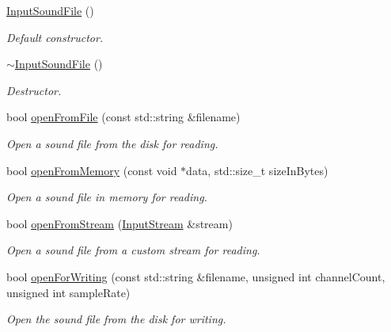 \begin{DoxyCompactItemize}
\item 
\mbox{\label{classsf_1_1_input_sound_file_a3b95347de25d1d93a3230287cf47a077}} 
\hyperlink{classsf_1_1_input_sound_file_a3b95347de25d1d93a3230287cf47a077}{Input\+Sound\+File} ()
\begin{DoxyCompactList}\small\item\em Default constructor. \end{DoxyCompactList}\item 
\mbox{\label{classsf_1_1_input_sound_file_a326a1a486587038123de0c187bf5c635}} 
\hyperlink{classsf_1_1_input_sound_file_a326a1a486587038123de0c187bf5c635}{$\sim$\+Input\+Sound\+File} ()
\begin{DoxyCompactList}\small\item\em Destructor. \end{DoxyCompactList}\item 
bool \hyperlink{classsf_1_1_input_sound_file_af68e54bc9bfac19554c84601156fe93f}{open\+From\+File} (const std\+::string \&filename)
\begin{DoxyCompactList}\small\item\em Open a sound file from the disk for reading. \end{DoxyCompactList}\item 
bool \hyperlink{classsf_1_1_input_sound_file_a4e034a8e9e69ca3c33a3f11180250400}{open\+From\+Memory} (const void $\ast$data, std\+::size\+\_\+t size\+In\+Bytes)
\begin{DoxyCompactList}\small\item\em Open a sound file in memory for reading. \end{DoxyCompactList}\item 
bool \hyperlink{classsf_1_1_input_sound_file_a32b76497aeb088a2b46dc6efd819b909}{open\+From\+Stream} (\hyperlink{classsf_1_1_input_stream}{Input\+Stream} \&stream)
\begin{DoxyCompactList}\small\item\em Open a sound file from a custom stream for reading. \end{DoxyCompactList}\item 
bool \hyperlink{classsf_1_1_input_sound_file_a84f32fdf5fa619538506395c3c5a030a}{open\+For\+Writing} (const std\+::string \&filename, unsigned int channel\+Count, unsigned int sample\+Rate)
\begin{DoxyCompactList}\small\item\em Open the sound file from the disk for writing. \end{DoxyCompactList}\item 

\end{DoxyCompactItemize}
